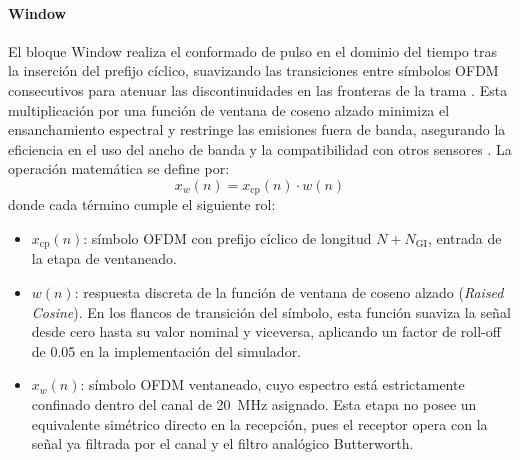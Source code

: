 \paragraph{Window}
El bloque Window realiza el conformado de pulso en el dominio del tiempo tras la inserción del prefijo cíclico, suavizando las transiciones entre símbolos OFDM consecutivos para atenuar las discontinuidades en las fronteras de la trama \cite{ieee80211bb2023}. Esta multiplicación por una función de ventana de coseno alzado minimiza el ensanchamiento espectral y restringe las emisiones fuera de banda, asegurando la eficiencia en el uso del ancho de banda y la compatibilidad con otros sensores \cite{ghassemlooy2019optical, kim2022ieee}. La operación matemática se define por:
\begin{equation}
	x_w(n) = x_{\text{cp}}(n) \cdot w(n)
	\label{eq:windowing}
\end{equation}
donde cada término cumple el siguiente rol:
\begin{itemize}
\item $x_{\text{cp}}(n)$: símbolo OFDM con prefijo cíclico de longitud $N + N_{\text{GI}}$, entrada de la etapa de ventaneado.
\item $w(n)$: respuesta discreta de la función de ventana de coseno alzado (\textit{Raised Cosine}). En los flancos de transición del símbolo, esta función suaviza la señal desde cero hasta su valor nominal y viceversa, aplicando un factor de roll-off de 0.05 en la implementación del simulador.
\item $x_w(n)$: símbolo OFDM ventaneado, cuyo espectro está estrictamente confinado dentro del canal de 20~MHz asignado. Esta etapa no posee un equivalente simétrico directo en la recepción, pues el receptor opera con la señal ya filtrada por el canal y el filtro analógico Butterworth.
\end{itemize}

